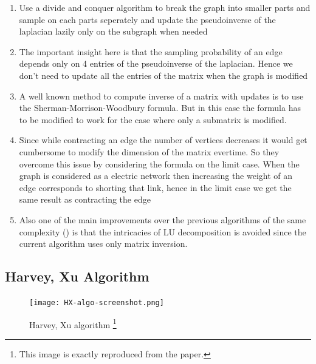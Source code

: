 \begin{enumerate}
 \item Use a divide and conquer algorithm to break the graph into smaller parts and sample on each parts seperately and update the pseudoinverse of the laplacian lazily only on the subgraph when needed
 \item The important insight here is that the sampling probability of an edge depends only on 4 entries of the pseudoinverse of the laplacian. Hence we don't need to update all the entries of the matrix when the graph is modified
 \item A well known method to compute inverse of a matrix with updates is to use the Sherman-Morrison-Woodbury formula. But in this case the formula has to be modified to work for the case where only a submatrix is modified.
 \item Since while contracting an edge the number of vertices decreases it would get cumbersome to modify the dimension of the matrix evertime. So they overcome this issue by considering the formula on the limit case. When the graph is considered as a electric network then increasing the weight of an edge corresponds to shorting that link, hence in the limit case we get the same result as contracting the edge
\item Also one of the main improvements over the previous algorithms of the same complexity (\citet{COLBOURN1996268}) is that the intricacies of LU decomposition is avoided since the current algorithm uses only matrix inversion.
\end{enumerate}



\subsection{Harvey, Xu Algorithm}

\begin{figure}[h!]
\begin{minipage}{\textwidth}
      \texttt{[image: HX-algo-screenshot.png]}
    \caption[Harvey, Xu algorithm]%
    {Harvey, Xu algorithm \footnote{This image is exactly reproduced from the paper.} }
  \end{minipage}

%     
  \label{fig:alg}
\end{figure}

